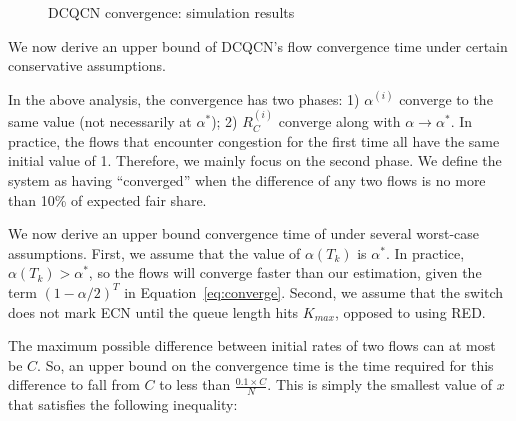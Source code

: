 \begin{figure}[t]
\center
\caption{DCQCN convergence: simulation results}
\label{fig:dcqcn_convergence_sim}
\end{figure}

 We now derive an upper bound of DCQCN's flow
convergence time under certain conservative assumptions. 

In the above analysis, the convergence has two phases: 1) $\alpha ^{(i)}$
converge to the same value (not necessarily at $\alpha^*$); 2) $R_C^{(i)}$
converge along with $\alpha \to \alpha^*$.  In practice, the flows that
encounter congestion for the first time all have the same initial value of 1.
Therefore, we mainly focus on the second phase. We define the system as having
``converged'' when the difference of any two flows is no more than 10\% of
expected fair share.

We now derive an upper bound convergence time of under several worst-case
assumptions. First, we assume that the value of $\alpha ({T_k})$ is $\alpha ^*$.
In practice, $\alpha ({T_k}) > \alpha ^*$, so the flows will converge faster
than our estimation, given the term $(1 - \alpha /2)^T$ in
Equation~\ref{eq:converge}.  Second, we assume that the switch does not mark ECN
until the queue length hits $K_{max}$, opposed to using RED. 

The maximum possible difference between initial rates of two flows can at most
be $C$. So, an upper bound on the convergence time is the time required for this
difference to fall from $C$ to less than $\frac{0.1 \times C}{N}$. This is
simply the smallest value of $x$ that satisfies the following inequality: 

